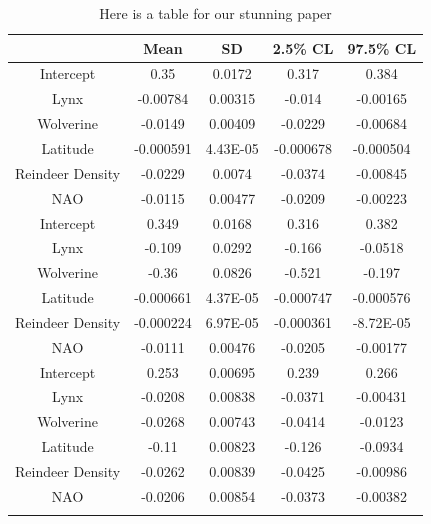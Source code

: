 \documentclass[11pt,american]{article}
\providecommand{\tabularnewline}{\\}
\begin{document}
\begin{table}


\caption{Here is a table for our stunning paper}


\center%
\begin{tabular}{|c|c|c|c|c|}
\hline 
 &
Mean &
SD &
2.5\% CL &
97.5\% CL\tabularnewline
\hline 
\hline 
Intercept &
0.35 &
0.0172 &
0.317 &
0.384\tabularnewline
\hline 
Lynx &
-0.00784 &
0.00315 &
-0.014 &
-0.00165\tabularnewline
\hline 
Wolverine &
-0.0149 &
0.00409 &
-0.0229 &
-0.00684\tabularnewline
\hline 
Latitude &
-0.000591 &
4.43E-05 &
-0.000678 &
-0.000504\tabularnewline
\hline 
Reindeer Density &
-0.0229 &
0.0074 &
-0.0374 &
-0.00845\tabularnewline
\hline 
NAO &
-0.0115 &
0.00477 &
-0.0209 &
-0.00223\tabularnewline
\hline 
Intercept &
0.349 &
0.0168 &
0.316 &
0.382\tabularnewline
\hline 
Lynx &
-0.109 &
0.0292 &
-0.166 &
-0.0518\tabularnewline
\hline 
Wolverine &
-0.36 &
0.0826 &
-0.521 &
-0.197\tabularnewline
\hline 
Latitude &
-0.000661 &
4.37E-05 &
-0.000747 &
-0.000576\tabularnewline
\hline 
Reindeer Density &
-0.000224 &
6.97E-05 &
-0.000361 &
-8.72E-05\tabularnewline
\hline 
NAO &
-0.0111 &
0.00476 &
-0.0205 &
-0.00177\tabularnewline
\hline 
Intercept &
0.253 &
0.00695 &
0.239 &
0.266\tabularnewline
\hline 
Lynx &
-0.0208 &
0.00838 &
-0.0371 &
-0.00431\tabularnewline
\hline 
Wolverine &
-0.0268 &
0.00743 &
-0.0414 &
-0.0123\tabularnewline
\hline 
Latitude &
-0.11 &
0.00823 &
-0.126 &
-0.0934\tabularnewline
\hline 
Reindeer Density &
-0.0262 &
0.00839 &
-0.0425 &
-0.00986\tabularnewline
\hline 
NAO &
-0.0206 &
0.00854 &
-0.0373 &
-0.00382\tabularnewline
\hline 
 &
 &
 &
 &
\tabularnewline
\hline 
\end{tabular}

\end{table}
\end{document}
